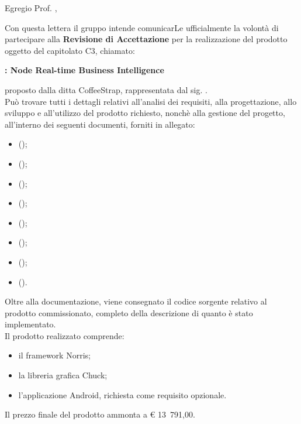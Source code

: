 \documentclass{letter}
\begin{document}
\begin{letter}{}

	\vspace{4cm}
	
	\opening{Egregio Prof. \committente{},}
	
	Con questa lettera il gruppo \groupname{} intende comunicarLe ufficialmente la volontà di partecipare alla \textbf{Revisione di Accettazione} per la realizzazione del prodotto oggetto del capitolato C3, chiamato:
	\begin{center}
		\textbf{\projectname{}: Node Real-time Business Intelligence}
	\end{center}
	proposto dalla ditta CoffeeStrap, rappresentata dal sig. \proponente{}.\\
	Può trovare tutti i dettagli relativi all'analisi dei requisiti, alla progettazione, allo sviluppo e all'utilizzo del prodotto richiesto, nonchè alla gestione del progetto, all'interno dei seguenti documenti, forniti in allegato:

	\begin{itemize}
		\item {} ();
		\item {} ();
		\item {} ();
		\item {} ();
		\item {} ();
		\item {} ();
		\item {} ();
		\item {} ().
	\end{itemize}
	
	Oltre alla documentazione, viene consegnato il codice sorgente relativo al prodotto commissionato, completo della descrizione di quanto è stato implementato.\\
	Il prodotto realizzato comprende:
	\begin{itemize}
		\item il framework Norris;
		\item la libreria grafica Chuck;
		\item l'applicazione Android, richiesta come requisito opzionale.
	\end{itemize}
	Il prezzo finale del prodotto ammonta a \euro{} 13~791,00.
	

\end{letter}
\end{document}

